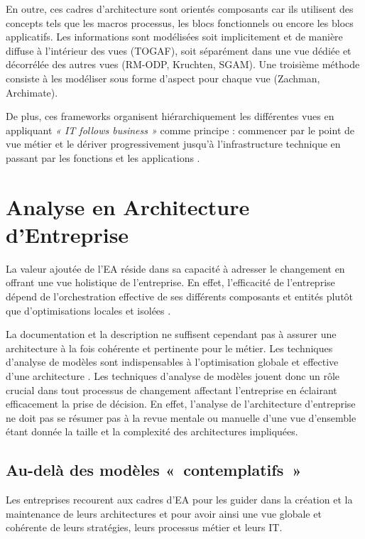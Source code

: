 En outre, ces cadres d'architecture sont orientés composants car ils utilisent des concepts tels que les macros processus, les blocs fonctionnels ou encore les blocs applicatifs. Les informations sont modélisées soit implicitement et de manière diffuse à l'intérieur des vues (TOGAF), soit séparément dans une vue dédiée et décorrélée des autres vues (RM-ODP, Kruchten, SGAM). Une troisième méthode consiste à les modéliser sous forme d'aspect pour chaque vue (Zachman, Archimate).

De plus, ces frameworks organisent hiérarchiquement les différentes vues en appliquant \emph{« IT follows business »} comme principe : commencer par le point de vue métier et le dériver progressivement jusqu'à l'infrastructure technique en passant par les fonctions et les applications \cite{winter2006essential}.


\section{Analyse en Architecture d'Entreprise}

La valeur ajoutée de l'EA réside dans sa capacité à adresser le changement en offrant une vue holistique de l'entreprise. En effet, l'efficacité de l'entreprise  dépend de l'orchestration effective de ses différents composants et entités plutôt que d'optimisations locales et isolées \cite{nadler1992organizational}. 

La documentation et la description ne suffisent cependant pas à assurer une architecture à la fois cohérente et pertinente pour le métier. Les techniques d'analyse de modèles sont indispensables à l'optimisation globale et effective d'une architecture \cite{lankhorst2013enterprise}. Les techniques d'analyse de modèles jouent donc un rôle crucial dans tout processus de changement affectant l'entreprise en éclairant efficacement la prise de décision. En effet, l'analyse de l'architecture d'entreprise ne doit pas se résumer pas à la revue mentale ou manuelle d'une vue d'ensemble étant donnée la taille et la complexité des architectures impliquées.

	\subsection{Au-delà des modèles «~contemplatifs~»}

Les entreprises recourent aux cadres d'EA pour les guider dans la création et la maintenance de leurs architectures et pour avoir ainsi une vue globale et cohérente de leurs stratégies, leurs processus métier et leurs IT.

